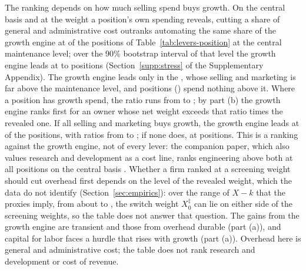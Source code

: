 The ranking depends on how much selling spend buys growth. On the central basis and at the weight a position's own spending reveals, cutting a share of general and administrative cost outranks automating the same share of the growth engine at \lpNGACutFirstNet{} of the \lpNPositions{} positions of Table~\ref{tab:levers-position} at the central maintenance level; over the 90\% bootstrap interval of that level the growth engine leads at \StLeverMin{} to \StLeverMax{} positions (Section~\ref{supp:stress} of the Supplementary Appendix). The growth engine leads only in the \MakeLowercase{\lpGEFirstNetList}, whose selling and marketing is far above the maintenance level, and \lpNNoGrowthSpend{} positions (\MakeLowercase{\lpNoGrowthSpendList}) spend nothing above it. Where a position has growth spend, the ratio runs from \lpRatioMin{} to \lpRatioMax; by part (b) the growth engine ranks first for an owner whose net weight exceeds that ratio times the revealed one. If all selling and marketing buys growth, the growth engine leads at \lpNGEFirstAllSM{} of the \lpNPositions{} positions, with ratios from \lpRatioAllSMMin{} to \lpRatioAllSMMax; if none does, at \lpNGEFirstNoSM{} positions. This is a ranking against the growth engine, not of every lever: the companion paper, which also values research and development as a cost line, ranks engineering above both at all \lpNPositions{} positions on the central basis \citep{murthy2026transformation}. Whether a firm ranked at a screening weight should cut overhead first depends on the level of the revealed weight, which the data do not identify (Section~\ref{sec:empirics}): over the range of $X-k$ that the proxies imply, from about \XkLo{} to \XkHi, the switch weight $X^\ddagger_0$ can lie on either side of the screening weights, so the table does not answer that question. The gains from the growth engine are transient and those from overhead durable (part (a)), and capital for labor faces a hurdle that rises with growth (part (a)). Overhead here is general and administrative cost; the table does not rank research and development or cost of revenue.

